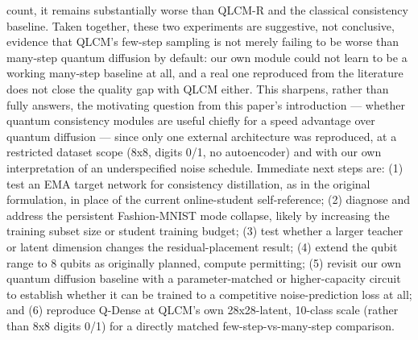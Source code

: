\documentclass[11pt]{article}
\begin{document}
count, it remains substantially worse than QLCM-R and the classical
consistency baseline. Taken together, these two experiments are suggestive,
not conclusive, evidence that QLCM's few-step sampling is not merely failing
to be worse than many-step quantum diffusion by default: our own module could
not learn to be a working many-step baseline at all, and a real one
reproduced from the literature does not close the quality gap with QLCM
either. This sharpens, rather than fully answers, the motivating question
from this paper's introduction --- whether quantum consistency modules are
useful chiefly for a speed advantage over quantum diffusion --- since only
one external architecture was reproduced, at a restricted dataset scope
(8x8, digits 0/1, no autoencoder) and with our own interpretation of an
underspecified noise schedule. Immediate next steps are: (1) test an EMA
target network for consistency distillation, as in the original formulation,
in place of the current online-student self-reference; (2) diagnose and
address the persistent Fashion-MNIST mode collapse, likely by increasing the
training subset size or student training budget; (3) test whether a larger
teacher or latent dimension changes the residual-placement result; (4)
extend the qubit range to 8 qubits as originally planned, compute
permitting; (5) revisit our own quantum diffusion baseline with a
parameter-matched or higher-capacity circuit to establish whether it can be
trained to a competitive noise-prediction loss at all; and (6) reproduce
Q-Dense at QLCM's own 28x28-latent, 10-class scale (rather than 8x8
digits 0/1) for a directly matched few-step-vs-many-step comparison.



\end{document}
